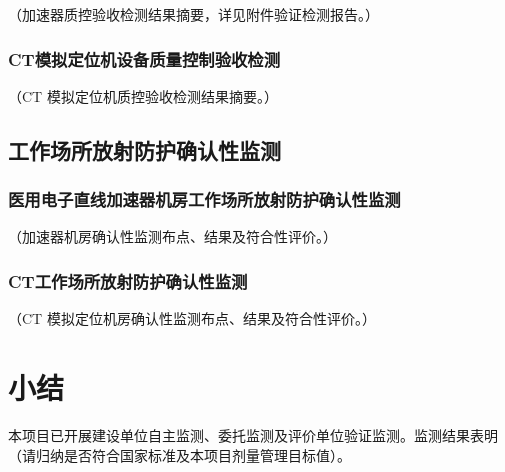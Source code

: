 （加速器质控验收检测结果摘要，详见附件验证检测报告。）

\subsubsection{CT模拟定位机设备质量控制验收检测}

（CT 模拟定位机质控验收检测结果摘要。）

\subsection{工作场所放射防护确认性监测}

\subsubsection{医用电子直线加速器机房工作场所放射防护确认性监测}

（加速器机房确认性监测布点、结果及符合性评价。）

\subsubsection{CT工作场所放射防护确认性监测}

（CT 模拟定位机房确认性监测布点、结果及符合性评价。）

\section{小结}

本项目已开展建设单位自主监测、委托监测及评价单位验证监测。监测结果表明（请归纳是否符合国家标准及本项目剂量管理目标值）。
